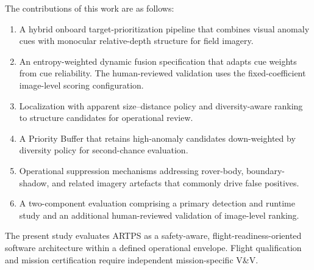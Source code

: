 \newpage
\vspace*{3pt}%
The contributions of this work are as follows:
\begingroup
\setlength{\itemsep}{2pt plus 0pt minus 1pt}
\setlength{\parsep}{0pt}
\setlength{\topsep}{2pt plus 0pt minus 1pt}
\setlength{\partopsep}{0pt}
\begin{enumerate}
  \item A hybrid onboard target-prioritization pipeline that combines visual anomaly cues with
  monocular relative-depth structure for field imagery.
  \item An entropy-weighted dynamic fusion specification that adapts cue weights from cue
  reliability.
  The human-reviewed validation uses the fixed-coefficient image-level scoring configuration.
  \item Localization with apparent size--distance policy and diversity-aware ranking to
  structure candidates for operational review.
  \item A Priority Buffer that retains high-anomaly candidates down-weighted by diversity
  policy for second-chance evaluation.
  \item Operational suppression mechanisms addressing rover-body, boundary-shadow, and related
  imagery artefacts that commonly drive false positives.
  \item A two-component evaluation comprising a primary detection and runtime study and an
  additional human-reviewed validation of image-level ranking.
\end{enumerate}
\endgroup
The present study evaluates ARTPS as a safety-aware, flight-readiness-oriented software
architecture within a defined operational envelope.
\newpage
Flight qualification and mission certification require independent mission-specific V\&V.
